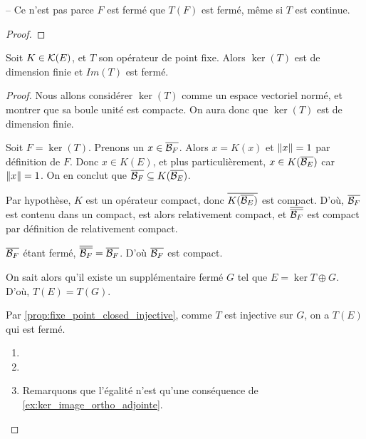 \begin{remarque}
	-- Ce n'est pas parce $F$ est fermé que $T(F)$ est fermé, même si $T$ est
	continue.
\end{remarque}

\begin{proof}
\end{proof}

\begin{proposition}
	Soit $K \in \mathcal{K}(E)$, et $T$ son opérateur de point fixe. Alors
	$\ker(T)$ est de dimension finie et $Im(T)$ est fermé.
\end{proposition}

\begin{proof}
	Nous allons considérer $\ker(T)$ comme un espace vectoriel normé, et montrer
	que sa boule unité est compacte. On aura donc que $\ker(T)$ est de
	dimension finie.

	Soit $F = \ker(T)$.
	Prenons un $x \in \overline{\mathcal{B}_{F}}$. Alors $x = K(x)$ et $\norm{x} = 1$
	par définition de $F$.
	Donc $x \in K(E)$, et plus particulièrement, $x \in
	K(\overline{\mathcal{B}_{E}})$ car $\norm{x} = 1$.
	On en conclut que $\overline{\mathcal{B}_{F}} \subseteq
	K(\overline{\mathcal{B}_{E}})$.

	Par hypothèse, $K$ est un opérateur compact, donc
	$\overline{K(\overline{\mathcal{B}_{E}})}$ est compact. D'où, $\overline{\mathcal{B}_{F}}$
	est contenu dans un compact, est alors relativement compact, et
	$\overline{\overline{\mathcal{B}_{F}}}$ est compact par définition de relativement
	compact.

	$\overline{\mathcal{B}_{F}}$ étant fermé, $\overline{\overline{\mathcal{B}_{F}}} =
	\overline{\mathcal{B}_{F}}$. D'où $\overline{\mathcal{B}_{F}}$ est compact.

	On sait alors qu'il existe un supplémentaire fermé $G$ tel que $E = \ker{T}
	\oplus G$. D'où, $T(E) = T(G)$.

	Par \ref{prop:fixe_point_closed_injective}, comme $T$ est injective sur $G$,
	on a $T(E)$ qui est fermé.
	\begin{enumerate}
		\item

		\item

		\item Remarquons que l'égalité n'est qu'une conséquence de
			\ref{ex:ker_image_ortho_adjointe}.
	\end{enumerate}
\end{proof}

